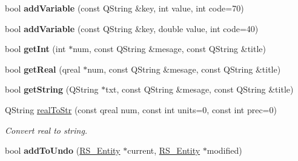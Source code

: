 \begin{DoxyCompactItemize}
\item 
\hypertarget{classDoc__plugin__interface_a3e7760da8e431672a03ce5c3983b1536}{bool {\bfseries add\-Variable} (const Q\-String \&key, int value, int code=70)}\label{classDoc__plugin__interface_a3e7760da8e431672a03ce5c3983b1536}

\item 
\hypertarget{classDoc__plugin__interface_a42e7211f492ecceb4939989b92469968}{bool {\bfseries add\-Variable} (const Q\-String \&key, double value, int code=40)}\label{classDoc__plugin__interface_a42e7211f492ecceb4939989b92469968}

\item 
\hypertarget{classDoc__plugin__interface_a3f1cde8f4a11811a35968ba062ff0c4e}{bool {\bfseries get\-Int} (int $\ast$num, const Q\-String \&mesage, const Q\-String \&title)}\label{classDoc__plugin__interface_a3f1cde8f4a11811a35968ba062ff0c4e}

\item 
\hypertarget{classDoc__plugin__interface_a1ceb1c051acc3f35439e55abaafa436e}{bool {\bfseries get\-Real} (qreal $\ast$num, const Q\-String \&mesage, const Q\-String \&title)}\label{classDoc__plugin__interface_a1ceb1c051acc3f35439e55abaafa436e}

\item 
\hypertarget{classDoc__plugin__interface_acde0aca2217e5e907394d91c0d5f70af}{bool {\bfseries get\-String} (Q\-String $\ast$txt, const Q\-String \&mesage, const Q\-String \&title)}\label{classDoc__plugin__interface_acde0aca2217e5e907394d91c0d5f70af}

\item 
Q\-String \hyperlink{classDoc__plugin__interface_ad13aadf9a029d9db752cafb3ea4a1ab7}{real\-To\-Str} (const qreal num, const int units=0, const int prec=0)
\begin{DoxyCompactList}\small\item\em Convert real to string. \end{DoxyCompactList}\item 
\hypertarget{classDoc__plugin__interface_aacce0afeaff6c36c316c3a8e3bc99f0e}{bool {\bfseries add\-To\-Undo} (\hyperlink{classRS__Entity}{R\-S\-\_\-\-Entity} $\ast$current, \hyperlink{classRS__Entity}{R\-S\-\_\-\-Entity} $\ast$modified)}\label{classDoc__plugin__interface_aacce0afeaff6c36c316c3a8e3bc99f0e}

\end{DoxyCompactItemize}


